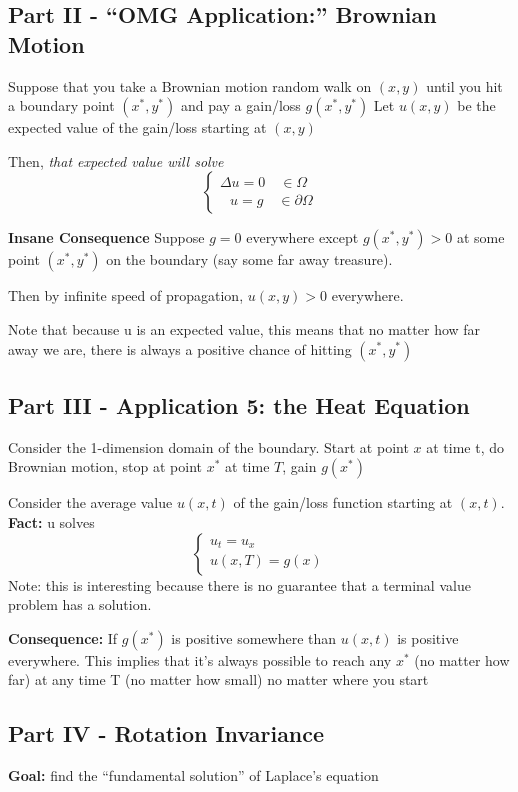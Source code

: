 \documentclass[12pt]{article}
\begin{document}
\subsection*{Part II - ``OMG Application:'' Brownian Motion}
Suppose that you take a Brownian motion random walk on $(x, y)$ until you hit a boundary point $(x^*, y^*)$ and pay a gain/loss $g(x^*, y^*)$
Let $u(x, y)$ be the expected value of the gain/loss starting at $(x, y)$

Then, \emph{that expected value will solve}
\[\begin{cases}
    \Delta u = 0 \quad \in \Omega\\
    \; \;\,u = g \quad \in \partial \Omega
\end{cases}\]

\textbf{Insane Consequence}
Suppose $g = 0$ everywhere except $g(x^*, y^*) >0$ at some point $(x^*, y^*)$ on the boundary (say some far away treasure).

Then by infinite speed of propagation, $u(x, y) >0$ everywhere. 

Note that because u is an expected value, this means that no matter how far away we are, there is always a positive chance of hitting $(x^*, y^*)$

\subsection*{Part III - Application 5: the Heat Equation}
Consider the 1-dimension domain of the boundary. Start at point $x$ at time t, do Brownian motion, stop at point $x^*$ at time $T$, gain $g(x^*)$

Consider the average value $u(x, t)$ of the gain/loss function starting at $(x, t)$.
\textbf{Fact:} u solves
\[\begin{cases}
    u_t = u_{x}\\
    u(x, T) = g(x)  
\end{cases}\]
Note: this is interesting because there is no guarantee that a terminal value problem has a solution. 

\textbf{Consequence:} If $g(x^*)$ is positive somewhere than $u(x, t)$ is positive everywhere. This implies that it's always possible to reach any $x^*$ (no matter how far) at any time T (no matter how small) no matter where you start

\subsection*{Part IV - Rotation Invariance}
\textbf{Goal:} find the ``fundamental solution'' of Laplace's equation
\end{document}
